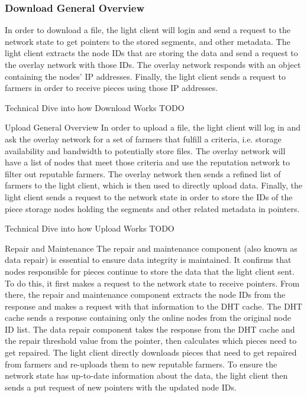 \documentclass[a4paper,10pt]{article}
\newcommand{\todo}[1]{{\color{red} TODO #1}}
\begin{document}
\subsubsection{Download General Overview}
In order to download a file, the light client will login and send a request to the
network state to get pointers to the stored segments, and other metadata. The light
client extracts the node IDs that are storing the data and send a request to the overlay
network with those IDs. The overlay network responds with an object containing the nodes’
IP addresses. Finally, the light client sends a request to farmers in order to receive
pieces using those IP addresses.


Technical Dive into how Download Works
\todo{}

Upload General Overview
In order to upload a file, the light client will log in and ask the overlay network
for a set of farmers that fulfill a criteria, i.e. storage availability and bandwidth
to potentially store files. The overlay network will have a list of nodes that meet
those criteria and use the reputation network to filter out reputable farmers. The
overlay network then sends a refined list of farmers to the light client, which is
then used to directly upload data. Finally, the light client sends a request to the
network state in order to store the IDs of the piece storage nodes holding the segments
and other related metadata in pointers.


Technical Dive into how Upload Works
\todo{}

Repair and Maintenance
The repair and maintenance component (also known as data repair) is essential to ensure
data integrity is maintained. It confirms that nodes responsible for pieces continue to
store the data that the light client sent. To do this, it first makes a request to the
network state to receive pointers. From there, the repair and maintenance component
extracts the node IDs from the response and makes a request with that information to the
DHT cache. The DHT cache sends a response containing only the online nodes from the original
node ID list. The data repair component takes the response from the DHT cache and the
repair threshold value from the pointer, then calculates which pieces need to get repaired. The
light client directly downloads pieces that need to get repaired from farmers and re-uploads
them to new reputable farmers. To ensure the network state has up-to-date information about
the data, the light client then sends a put request of new pointers with the updated node IDs.
\end{document}
